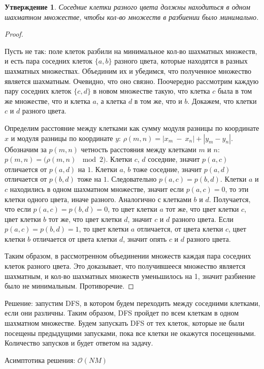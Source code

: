 \documentclass[12pt]{article}
\newtheorem*{prop}{Утверждение}
\theoremstyle{definition}
\begin{document}
\begin{prop}
Соседние клетки разного цвета должны находиться в одном шахматном множестве, чтобы кол-во множеств в разбиении было минимально.
\end{prop}
\begin{proof}~

Пусть не так: поле клеток разбили на минимальное кол-во шахматных множеств, и есть пара соседних клеток $\{a, b\}$ разного цвета, которые находятся в разных шахматных множествах. Объединим их и убедимся, что полученное множество является шахматным. Очевидно, что оно связно. Поочередно рассмотрим каждую пару соседних клеток $\{c, d\}$ в новом множестве такую, что клетка $c$ была в том же множестве, что и клетка $a$, а клетка $d$ в том же, что и $b$. Докажем, что клетки $c$ и $d$ разного цвета. 

Определим расстояние между клетками как сумму модуля разницы по координате $x$ и модуля разницы по координате $y$: $\rho(m, n) = |x_m~-~x_n| + |y_m - y_n|$. Обозначим за $p(m, n)$ четность расстояния между клетками $m$ и $n$: $p(m, n) = (\rho(m, n)$\,$\mod 2)$. Клетки $c$, $d$ соседние, значит $p(a, c)$ отличается от $p(a, d)$ на $1$. Клетки $a$, $b$ тоже соседние, значит $p(a, d)$ отличается от $p(b, d)$ тоже на $1$. Следовательно $p(a, c) = p(b, d)$. Клетки $a$ и $c$ находились в одном шахматном множестве, значит если $p(a, c) = 0$, то эти клетки одного цвета, иначе разного. Аналогично с клетками $b$ и $d$. Получается, что если $p(a, c) = p(b, d) = 0$, то цвет клетки $a$ тот же, что цвет клетки $c$, цвет клетки $b$ тот же, что цвет клетки $d$, значит $c$ и $d$ разного цвета. Если $p(a, c) = p(b, d) = 1$, то цвет клетки $a$ отличается, от цвета клетки $c$, цвет клетки $b$ отличается от цвета клетки $d$, значит опять $c$ и $d$ разного цвета. 

Таким образом, в рассмотренном объединении множеств каждая пара соседних клеток разного цвета. Это доказывает, что получившееся множество является шахматным, и кол-во шахматных множеств уменьшилось на 1, значит разбиение было не минимальным. Противоречие.
\end{proof}

Решение: запустим DFS, в котором будем переходить между соседними клетками, если они различны. Таким образом, DFS пройдет по всем клеткам в одном шахматном множестве. Будем запускать DFS от тех клеток, которые не были посещены предыдущими запусками, пока все клетки не окажутся посещенными. Количество запусков и будет ответом на задачу.

Асимптотика решения: $\mathcal{O}(NM)$
\end{document}

